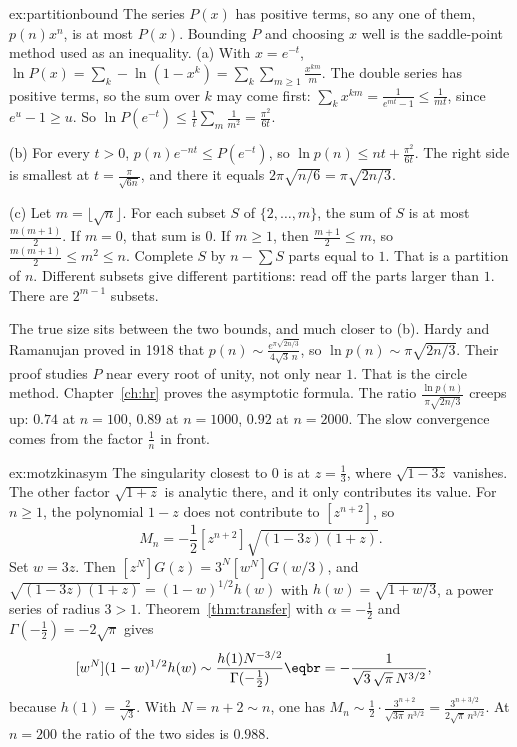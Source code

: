 \begin{solution}{ex:partitionbound}
\idea The series $P(x)$ has positive terms, so any one of them, $p(n)x^n$, is at most $P(x)$. Bounding $P$ and choosing $x$ well is the saddle-point method used as an inequality.
\writeup (a) With $x=e^{-t}$, $\ln P(x)=\sum_k-\ln(1-x^k)=\sum_k\sum_{m\ge1}\frac{x^{km}}m$. The double series has positive terms, so the sum over $k$ may come first: $\sum_kx^{km}=\frac1{e^{mt}-1}\le\frac1{mt}$, since $e^u-1\ge u$. So $\ln P(e^{-t})\le\frac1t\sum_m\frac1{m^2}=\frac{\pi^2}{6t}$.

(b) For every $t>0$, $p(n)e^{-nt}\le P(e^{-t})$, so $\ln p(n)\le nt+\frac{\pi^2}{6t}$. The right side is smallest at $t=\frac\pi{\sqrt{6n}}$, and there it equals $2\pi\sqrt{n/6}=\pi\sqrt{2n/3}$.

(c) Let $m=\lfloor\sqrt n\rfloor$. For each subset $S$ of $\{2,\dots,m\}$, the sum of $S$ is at most $\frac{m(m+1)}2$. If $m=0$, that sum is $0$. If $m\ge1$, then $\frac{m+1}2\le m$, so $\frac{m(m+1)}2\le m^2\le n$. Complete $S$ by $n-\sum S$ parts equal to $1$. That is a partition of $n$. Different subsets give different partitions: read off the parts larger than $1$. There are $2^{m-1}$ subsets.

The true size sits between the two bounds, and much closer to (b). Hardy and Ramanujan proved in 1918 that $p(n)\sim\frac{e^{\pi\sqrt{2n/3}}}{4\sqrt3\,n}$, so $\ln p(n)\sim\pi\sqrt{2n/3}$. Their proof studies $P$ near every root of unity, not only near $1$. That is the circle method. Chapter~\ref{ch:hr} proves the asymptotic formula. The ratio $\frac{\ln p(n)}{\pi\sqrt{2n/3}}$ creeps up: $0.74$ at $n=100$, $0.89$ at $n=1000$, $0.92$ at $n=2000$. The slow convergence comes from the factor $\frac1n$ in front.
\end{solution}

\begin{solution}{ex:motzkinasym}
\idea The singularity closest to $0$ is at $z=\frac13$, where $\sqrt{1-3z}$ vanishes. The other factor $\sqrt{1+z}$ is analytic there, and it only contributes its value.
\writeup For $n\ge1$, the polynomial $1-z$ does not contribute to $[z^{n+2}]$, so
\[
M_n=-\frac12[z^{n+2}]\sqrt{(1-3z)(1+z)}.
\]
Set $w=3z$. Then $[z^N]G(z)=3^N[w^N]G(w/3)$, and $\sqrt{(1-3z)(1+z)}=(1-w)^{1/2}h(w)$ with $h(w)=\sqrt{1+w/3}$, a power series of radius $3>1$. Theorem~\ref{thm:transfer}
with $\alpha=-\frac12$ and $\Gamma(-\frac12)=-2\sqrt\pi$ gives
\[
\begin{aligned}{}[w^N](1-w)^{1/2}h(w)&\sim\frac{h(1)N^{-3/2}}{\Gamma(-\frac12)}\eqbr=-\frac{1}{\sqrt3\,\sqrt\pi\,N^{3/2}},\end{aligned}
\]
because $h(1)=\frac2{\sqrt3}$. With $N=n+2\sim n$, one has $M_n\sim\frac12\cdot\frac{3^{n+2}}{\sqrt{3\pi}\,n^{3/2}}=\frac{3^{n+3/2}}{2\sqrt\pi\,n^{3/2}}$. At $n=200$ the ratio of the two sides is $0.988$.
\end{solution}

